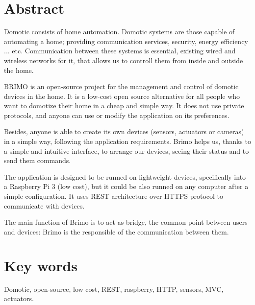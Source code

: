 \section*{Abstract}
Domotic consists of home automation. Domotic systems are those capable of automating a home; providing communication services,
security, energy efficiency ... etc. Communication between these systems is essential, existing wired and wireless networks for it,
that allows us to controll them from inside and outside the home.

BRIMO is an open-source project for the management and control of domotic devices in the home. It is a low-cost open source alternative for all people
 who want to domotize their home in a cheap and simple way. It does not use private protocols, and anyone can use or modify the application on its preferences.

Besides, anyone is able to create its own devices (sensors, actuators or cameras) in a simple way, following the application requirements. Brimo helps us, thanks to
a simple and intuitive interface, to arrange our devices, seeing their status and to send them commands.

The application is designed to be runned on lightweight devices, specifically into a Raspberry Pi 3 (low cost), but it could be also runned on any computer after a simple
configuration. It uses REST architecture over HTTPS protocol to communicate with devices.

The main function of Brimo is to act as bridge, the common point between users and devices: Brimo is the responsible of the communication between them.
\section*{Key words}

Domotic, open-source, low cost, REST, raspberry, HTTP, sensors, MVC, actuators.